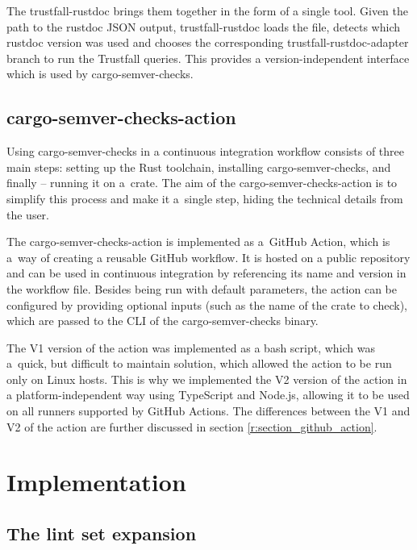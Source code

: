 \documentclass[licencjacka,en]{pracamgr}
\begin{document}
The trustfall-rustdoc brings them together in the form of a single tool. Given the path to
the rustdoc JSON output, trustfall-rustdoc loads the file, detects which rustdoc version was used
and chooses the corresponding trustfall-rustdoc-adapter branch to run the Trustfall queries.
This provides a version-independent interface which is used by cargo-semver-checks.

\section{cargo-semver-checks-action}\label{r:section_cargo_semver_checks_action}

Using cargo-semver-checks in a continuous integration workflow consists of three main steps:
setting up the Rust toolchain, installing cargo-semver-checks, and finally -- running it on a~crate.
The aim of the cargo-semver-checks-action is to simplify this process and make it a~single step,
hiding the technical details from the user.

The cargo-semver-checks-action is implemented as a~GitHub Action, which is a~way of creating
a reusable GitHub workflow. It is hosted on a public repository and can be used in continuous
integration by referencing its name and version in the workflow file. Besides being run with default
parameters, the action can be configured by providing optional inputs (such as the name of the crate
to check), which are passed to the CLI of the cargo-semver-checks binary.

The V1 version of the action was implemented as a bash script, which was a~quick, but difficult
to maintain solution, which allowed the action to be run only on Linux hosts. This is why
we implemented the V2 version of the action in a platform-independent way using TypeScript
and Node.js, allowing it to be used on all runners supported by GitHub Actions.
The differences between the V1 and V2 of the action are further discussed in section
\ref{r:section_github_action}.


\chapter{Implementation}\label{r:chapter_implementation}

\section{The lint set expansion}\label{r:section_new_lints}
\end{document}
